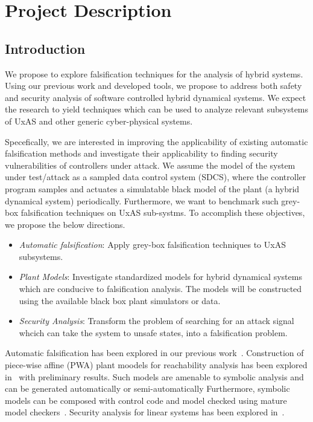 \section{Project Description}

%
%
%

\subsection{Introduction}

We propose to explore falsification techniques for the analysis of
hybrid systems. Using our previous work and developed tools, we
propose to address both safety and security analysis of software
controlled hybrid dynamical systems. We expect the research to yield
techniques which can be used to analyze relevant subsystems of UxAS
and other generic cyber-physical systems.

Specefically, we are interested in improving the applicability of
existing automatic falsification methods and investigate their
applicability to finding security vulnerabilities of controllers under
attack. We assume the model of the system under test/attack as a
sampled data control system (SDCS), where the controller program
samples and actuates a simulatable black model of the plant (a hybrid
dynamical system) periodically. Furthermore, we want to benchmark such
grey-box falsification techniques on UxAS sub-systms. To accomplish
these objectives, we propose the below directions.
\begin{itemize}
    \item \emph{Automatic falsification}: Apply grey-box falsification
        techniques to UxAS subsystems.
    \item \emph{Plant Models}: Investigate standardized models for
        hybrid dynamical systems which are conducive to falsification
        analysis. The models will be constructed using the available
        black box plant simulators or data.
    \item \emph{Security Analysis}:
        Transform the problem of searching for an attack signal whcich
        can take the system to unsafe states, into a falsification
        problem.
\end{itemize}

Automatic falsification has been explored in our previous
work~\cite{Zutshi+Others/2013/Trajectory, zutshi2014multiple,
zutshi2016symbolic}. Construction of piece-wise affine (PWA) plant
moodels for reachability analysis has been explored
in~\cite{Zutshi2016} with preliminary results. Such models are
amenable to symbolic analysis and can be generated automatically or
semi-automatically
Furthermore, symbolic models can be composed with
control code and model checked using mature model
checkers~\cite{kroening2014cbmc}. Security analysis for linear systems
has been explored in~\cite{pajic2014robustness, pajic2015attack}.

